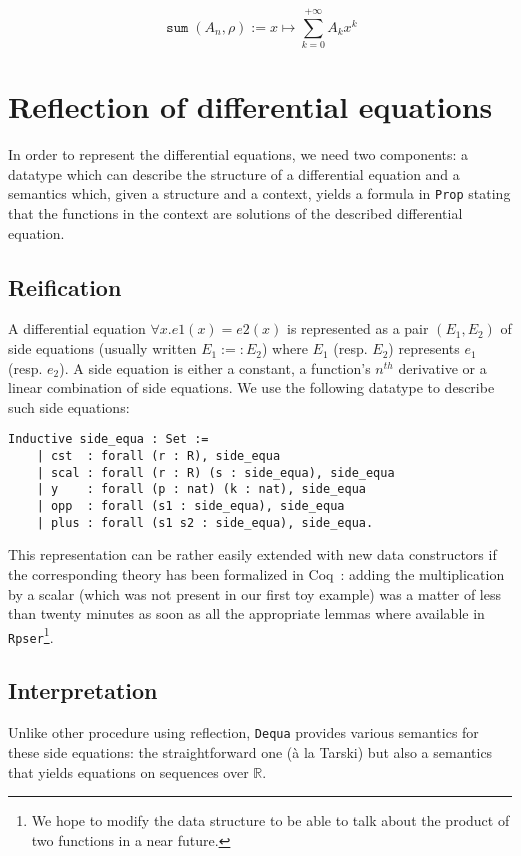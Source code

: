 \documentclass{article}
\newcommand{\Prop}{\texttt{Prop}}
\newcommand{\coq}{Coq}
\newcommand{\R}{\mathbb{R}}
\newcommand{\dequa}{\texttt{Dequa}}
\newcommand{\Rpser}{\texttt{Rpser}}
\DeclareMathOperator{\Psum}{\mathtt{sum}}
\begin{document}
$$\Psum{}(A_n, \rho) := x \mapsto \sum_{k=0}^{+ \infty} A_k x^k$$

\section{Reflection of differential equations}

In order to represent the differential equations, we need two components: a
datatype which can describe the structure of a differential equation and a
semantics which, given a structure and a context, yields a formula in
\Prop{} stating that the functions in the context are solutions of the
described differential equation.

\subsection{Reification}

A differential equation $\forall x. e1(x) = e2(x)$ is represented as a pair
$(E_1, E_2)$ of side equations (usually written $E_1 :=: E_2$) where $E_1$ (resp.
$E_2$) represents $e_1$ (resp. $e_2$). A side equation is either a constant,
a function's $n^{th}$ derivative or a linear combination of side equations. We
use the following datatype to describe such side equations:


\begin{verbatim}
Inductive side_equa : Set :=
    | cst  : forall (r : R), side_equa
    | scal : forall (r : R) (s : side_equa), side_equa
    | y    : forall (p : nat) (k : nat), side_equa
    | opp  : forall (s1 : side_equa), side_equa
    | plus : forall (s1 s2 : side_equa), side_equa.
\end{verbatim}

This representation can be rather easily extended with new data constructors if
the corresponding theory has been formalized in \coq{}~\cite{coq}: adding the multiplication
by a scalar (which was not present in our first toy example) was a matter of less
than twenty minutes as soon as all the appropriate lemmas where available in
\Rpser{}\footnote{We hope to modify the data structure to be able to talk about
the product of two functions in a near future.}.

\subsection{Interpretation}

Unlike other procedure using reflection, \dequa{} provides various semantics for
these side equations: the straightforward one (\`a la Tarski) but also a semantics
that yields equations on sequences over $\R$.
\end{document}
